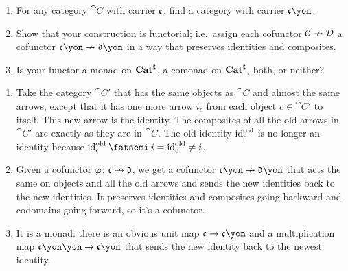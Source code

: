 \documentclass[Book-Poly]{subfiles}
\begin{document}
\begin{exercise}
\begin{enumerate}
	\item For any category $\cat{C}$ with carrier $\mathfrak{c}$, find a category with carrier $\car{c}\yon$.
	\item Show that your construction is functorial; i.e.\ assign each cofunctor $\mathcal{C}\nrightarrow\mathcal{D}$ a cofunctor $\car{c}\yon\cof\car{d}\yon$ in a way that preserves identities and composites.
	\item Is your functor a monad on $\mathbf{Cat}^\sharp$, a comonad on $\mathbf{Cat}^\sharp$, both, or neither?
\qedhere
\end{enumerate}
\begin{solution}
\begin{enumerate}
    \item Take the category $\cat{C}'$ that has the same objects as $\cat{C}$ and almost the same arrows, except that it has one more arrow $i_c$ from each object $c\in\cat{C}'$ to itself. This new arrow is the identity. The composites of all the old arrows in $\cat{C}'$ are exactly as they are in $\cat{C}$. The old identity $\mathrm{id}_c^{\textnormal{old}}$ is no longer an identity because $\id_c^\tn{old}\then i=\id_c^\tn{old}\neq i$.
    \item Given a cofunctor $\varphi\colon\mathfrak{c}\nrightarrow\mathfrak{d}$, we get a cofunctor $\car{c}\yon\cof\car{d}\yon$ that acts the same on objects and all the old arrows and sends the new identities back to the new identities. It preserves identities and composites going backward and codomains going forward, so it's a cofunctor.
    \item It is a monad: there is an obvious unit map $\car{c}\to\car{c}\yon$ and a multiplication map $\car{c}\yon\yon\to\car{c}\yon$ that sends the new identity back to the newest identity.
\end{enumerate}
\end{solution}
\end{exercise}
\end{document}
